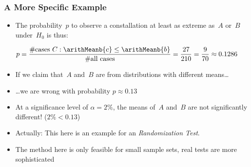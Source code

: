\documentclass[aspectratio=169,mathserif,notheorems]{beamer}%
\begin{document}
\begin{frame}[t]\frametitle{A More Specific Example}%
%
\begin{itemize}%
\item The probability~$p$ to observe a constallation at least as extreme as~$A$ or~$B$ under~$H_0$ is thus:%
\end{itemize}%
\addtocounter{equation}{-1}%
\begin{equation}%
p=\frac{\textnormal{\#cases~$C$}:\arithMeanb{c}\leq \arithMeanb{b}}{\textnormal{\#all cases}}=\frac{{27}}{{210}}=\frac{9}{70}\approx {0.1286}%
\nonumber\end{equation}%
%
\begin{itemize}%
\item<2-> If we claim that~$A$ and~$B$ are from distributions with different means\dots%
\item<3-> {\dots}we are wrong with probability $p\approx 0.13$
\item<4-> At a significance level of $\ensuremath{\alpha}=2\%$, the \alert{means} of~$A$ and~$B$ are not significantly different! ($2\%<0.13$)%
\item<5-> Actually: This here is an example for an \emph{Randomization Test}\cite{BLB2008VMIDBS,E1995RT}.%
\item<6-> \alert<6>{The method here is only feasible for small sample sets, real tests are more sophisticated}%
\end{itemize}%
%
\end{frame}%
%
\end{document}
